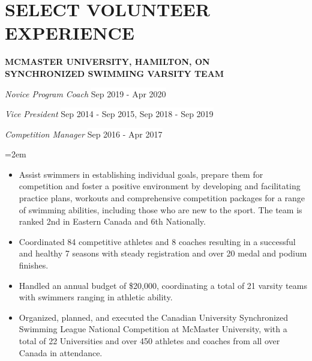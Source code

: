 \documentclass[paper=a4,fontsize=11pt]{scrartcl}	 			%
\newcommand{\NewPart}[1]{\section*{\uppercase{#1}}}
\newcommand{\EducationEntry}[4]{
		\noindent \textbf{#1} \hfill 					%
		\colorbox{White}{%
			\parbox{10em}{%
			\hfill\color{Black}#2}} \par				%
		\noindent \textit{#3} \par					%
		\noindent\hangindent=2em\hangafter=0 \small #4 	%
		\normalsize \par}
\newcommand{\WorkEntryThree}[8]{						%
		\noindent \textbf{#1} \par		%
		\noindent \textit{\noindent #2} \hfill 					%
		\noindent \colorbox{White}{\color{Black}#3} \par
		\noindent \textit{\noindent #4} \hfill 					%
		\noindent \colorbox{White}{\color{Black}#5} \par
		\noindent \textit{\noindent #6} \hfill 					%
		\noindent \colorbox{White}{\color{Black}#7} \par					%
		\noindent\hangindent=2em\hangafter=0 \small #8 	%
		\normalsize \par}
\begin{document}
\NewPart{Select Volunteer Experience}{}
\WorkEntryThree{\MakeUppercase{McMaster University, Hamilton, ON \\ Synchronized Swimming Varsity Team}}
{Novice Program Coach}{Sep 2019 - Apr 2020}
{Vice President}{Sep 2014 - Sep 2015, Sep 2018 - Sep 2019}
{Competition Manager}{Sep 2016 - Apr 2017}{
\begin{itemize}
	\item Assist swimmers in establishing individual goals, prepare them for competition and foster a positive environment by developing and facilitating practice plans, workouts and comprehensive competition packages for a range of swimming abilities, including those who are new to the sport. The team is ranked 2nd in Eastern Canada and 6th Nationally.
	\item Coordinated 84 competitive athletes and 8 coaches resulting in a successful and healthy 7 seasons with steady registration and over 20 medal and podium finishes.
	\item Handled an annual budget of \$20,000, coordinating a total of 21 varsity teams with swimmers ranging in athletic ability. 
	\item Organized, planned, and executed the Canadian University Synchronized Swimming League National Competition at McMaster University, with a total of 22 Universities and over 450 athletes and coaches from all over Canada in attendance.
	
\end{itemize}}
\end{document}
